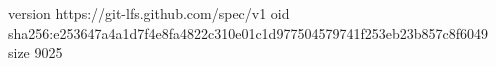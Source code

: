 version https://git-lfs.github.com/spec/v1
oid sha256:e253647a4a1d7f4e8fa4822c310e01c1d977504579741f253eb23b857c8f6049
size 9025
